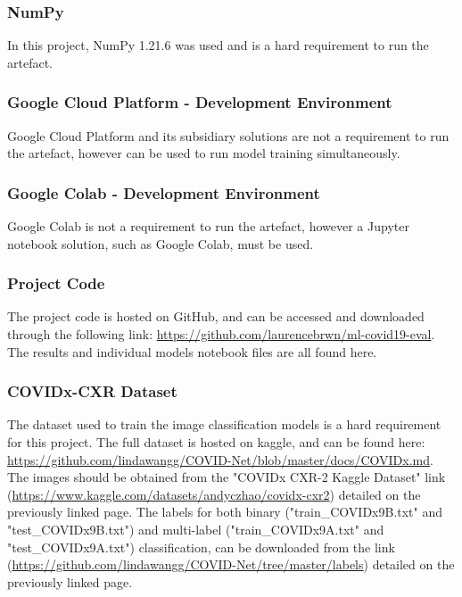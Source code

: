 \subsubsection{NumPy}
In this project, NumPy 1.21.6 was used and is a hard requirement to run the artefact.

\subsubsection{Google Cloud Platform - Development Environment}
Google Cloud Platform and its subsidiary solutions are not a requirement to run the artefact, however can be used to run model training simultaneously.

\subsubsection{Google Colab - Development Environment}
Google Colab is not a requirement to run the artefact, however a Jupyter notebook solution, such as Google Colab, must be used.

\subsubsection{Project Code}
The project code is hosted on GitHub, and can be accessed and downloaded through the following link: \url{https://github.com/laurencebrwn/ml-covid19-eval}. The results and individual models notebook files are all found here.

\subsubsection{COVIDx-CXR Dataset}
The dataset used to train the image classification models is a hard requirement for this project. The full dataset is hosted on kaggle, and can be found here: \url{https://github.com/lindawangg/COVID-Net/blob/master/docs/COVIDx.md}. The images should be obtained from the "COVIDx CXR-2 Kaggle Dataset" link (\url{https://www.kaggle.com/datasets/andyczhao/covidx-cxr2}) detailed on the previously linked page. The labels for both binary ("train\_COVIDx9B.txt" and "test\_COVIDx9B.txt") and multi-label ("train\_COVIDx9A.txt" and "test\_COVIDx9A.txt") classification, can be downloaded from the link (\url{https://github.com/lindawangg/COVID-Net/tree/master/labels}) detailed on the previously linked page.

